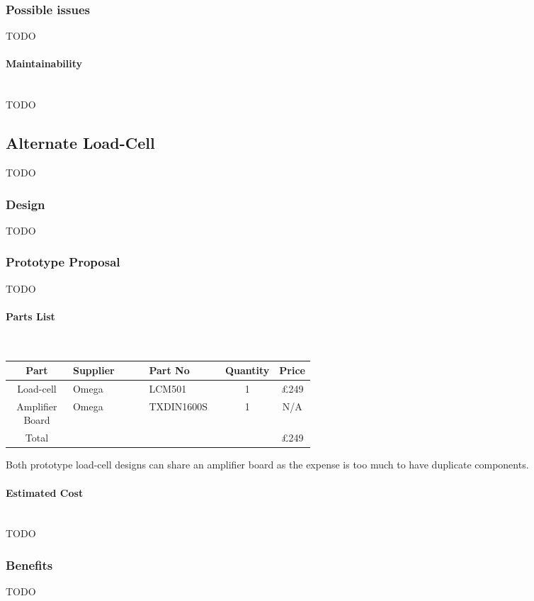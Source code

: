 \documentclass[11pt]{article}
\begin{document}
\subsubsection{Possible issues}
TODO
\paragraph{Maintainability}\mbox{}\\
TODO

\subsection{Alternate Load-Cell}
TODO
\subsubsection{Design}
TODO
\subsubsection{Prototype Proposal}
TODO
\paragraph{Parts List}\mbox{}\\

\begin{center}
    \begin{longtable}{||c | p{0.25\linewidth}   |p{0.25\linewidth} | c | c||} 
      \hline
      Part & Supplier & Part No & Quantity & Price \\ [0.5ex] 
      \hline\hline
      Load-cell & Omega & LCM501  & 1 & \pounds249 \\ 
      \hline
      Amplifier Board & Omega & TXDIN1600S & 1 & N/A \\
      \hline
      \hline
      Total & & & & \pounds249 \\
      \hline
    \end{longtable}
\end{center}

Both prototype load-cell designs can share an amplifier board as the expense is too much to have duplicate components.

\paragraph{Estimated Cost}\mbox{}\\
TODO
\subsubsection{Benefits}
TODO
\end{document}

